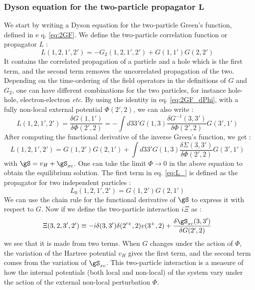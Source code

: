 \subsubsection{Dyson equation for the two-particle propagator $\mathbf{L}$}
We start by writing a Dyson equation for the two-particle Green's function, defined in e q. \eqref{eq:2GF}.  We define the two-particle correlation function or propagator $L$ :
\begin{equation}
	L(1,2,1',2') = - G_2(1,2,1',2') + G(1,1')G(2,2') \label{eq:L}
\end{equation}
It contains the correlated propagation of a particle and a hole which is the first term, and the second term removes the uncorrelated propagation of the two. Depending on the time-ordering of the field operators in the definitions of $G$ and $G_2$, one can have different combinations for the two particles, for instance hole-hole, electron-electron \textit{etc}.
By using the identity in eq. \eqref{eq:2GF_dPhi}, with a fully non-local external potential $\Phi(2',2)$, we can also write :
\begin{equation}
	L(1,2,1',2') = \frac{\delta G(1,1')}{\delta \Phi(2',2)} = -\int d33' G(1,3)\frac{\delta G^{-1}(3,3')}{\delta\Phi(2',2)}G(3',1')
\end{equation}
After computing the functional derivative of the inverse Green's function, we get :
\begin{equation}
	L(1,2,1',2') = G(1,2')G(2,1') + \int d33' G(1,3) \frac{\delta \Sigma(3,3')}{\delta \Phi(2',2)} G(3',1') \label{eq:L_}
\end{equation}
with $\gS = v_H + \gS_{xc}$. One can take the limit $\Phi \to 0$ in the above equation to obtain the equilibrium solution. The first term in eq. \eqref{eq:L_} is defined as the propagator for two independent particles :
\begin{equation}
	L_0(1,2,1',2') = G(1,2') G(2,1') 
\end{equation}
We can use the chain rule for the functional derivative of $\gS$ to express it with respect to $G$. Now if we define the two-particle interaction $i\Xi$ as :
\begin{equation}
	\Xi(3,2,3',2') \equiv -i \delta(3,3')\delta(2'^+,2)v(3^+,2) + \frac{\delta \gS_{xc}(3,3')}{\delta G(2',2)}
\end{equation}
we see that it is made from two terms. When $G$ changes under the action of $\Phi$, the variation of the Hartree potential $v_H$ gives the first term, and the second term comes from the variation of $\gS_{xc}$. This two-particle interaction is a measure of how the internal potentials (both local and non-local) of the system vary under the action of the external non-local perturbation $\Phi$.
